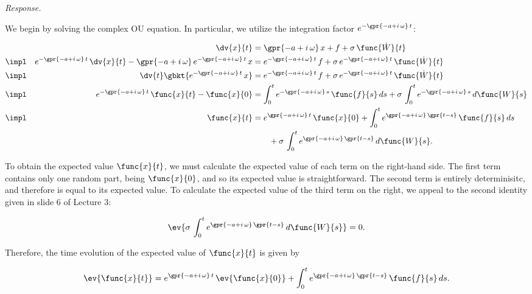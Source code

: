 \textit{Response.} 

We begin by solving the complex OU equation. In particular, we utilize the integration factor $e^{-\gpr{-a + i\,\omega}\,t}$:

\begin{alignat}{2}
	& & \dv{x}{t} &= \gpr{-a + i\,\omega}\,x + f + \sigma\,\func{\dot{W}}{t} \nonumber \\
	\impl & & e^{-\gpr{-a + i\,\omega}\,t}\,\dv{x}{t} - \gpr{-a + i\,\omega}\,e^{-\gpr{-a + i\,\omega}\,t}\,x &= e^{-\gpr{-a + i\,\omega}\,t}\,f + \sigma\,e^{-\gpr{-a + i\,\omega}\,t}\,\func{\dot{W}}{t} \nonumber \\
	\impl & & \dv{t}\gbkt{e^{-\gpr{-a + i\,\omega}\,t}\,x} &= e^{-\gpr{-a + i\,\omega}\,t}\,f + \sigma\,e^{-\gpr{-a + i\,\omega}\,t}\,\func{\dot{W}}{t} \nonumber \\
	\impl & & e^{-\gpr{-a + i\,\omega}\,t}\,\func{x}{t} - \func{x}{0} &= \int_{0}^{t} e^{-\gpr{-a + i\,\omega}\,s}\,\func{f}{s}\,ds + \sigma\,\int_{0}^{t} e^{-\gpr{-a + i\,\omega}\,s}\,d\func{W}{s} \nonumber \\
	\impl & & \func{x}{t} &= e^{\gpr{-a + i\,\omega}\,t}\,\func{x}{0} + \int_{0}^{t} e^{\gpr{-a + i\,\omega}\,\gpr{t - s}}\,\func{f}{s}\,ds \nonumber \\
	& & &\qquad + \sigma\,\int_{0}^{t} e^{\gpr{-a + i\,\omega}\,\gpr{t - s}}\,d\func{W}{s}.
\end{alignat}

To obtain the expected value $\func{x}{t}$, we must calculate the expected value of each term on the right-hand side. The first term contains only one random part, being $\func{x}{0}$, and so its expected value is straightforward. The second term is entirely determinisitc, and therefore is equal to its expected value. To calculate the expected value of the third term on the right, we appeal to the second identity given in slide 6 of Lecture 3:

\begin{equation}
	\ev{\sigma\,\int_{0}^{t} e^{\gpr{-a + i\,\omega}\,\gpr{t - s}}\,d\func{W}{s}} = 0.
\end{equation}

Therefore, the time evolution of the expected value of $\func{x}{t}$ is given by

\begin{equation}
	\ev{\func{x}{t}} = e^{\gpr{-a + i\,\omega}\,t}\,\ev{\func{x}{0}} + \int_{0}^{t} e^{\gpr{-a + i\,\omega}\,\gpr{t - s}}\,\func{f}{s}\,ds.
\end{equation}

